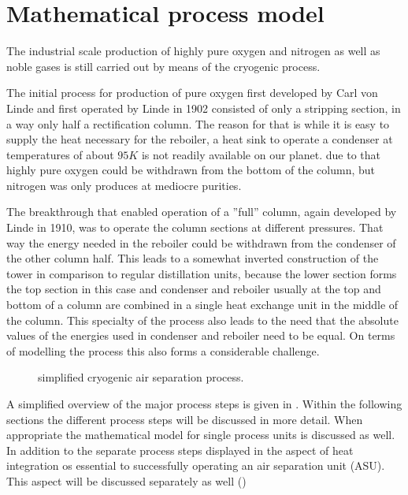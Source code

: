 \chapter{Mathematical process model}
\label{chp:MathModel}

    The industrial scale production of highly pure oxygen and nitrogen as well as noble
    gases is still carried out by means of the cryogenic process.

    The initial process for production of pure oxygen first developed by Carl von Linde
    and first operated by Linde in 1902 \cite{Barron.1985} consisted of only
    a stripping section, in a way only half a rectification column. The reason for that is
    while it is easy to supply the heat necessary for the reboiler, a heat sink to operate
    a condenser at temperatures of about $95 K$ is not readily available on our planet.
    due to that highly pure oxygen could be withdrawn from the bottom of the column, but
    nitrogen was only produces at mediocre purities.

    The breakthrough that enabled operation of a ''full'' column, again developed by Linde in 1910,  was to operate the
    column sections at different pressures. That way the energy needed in the reboiler
    could be withdrawn from the condenser of the other column half. This leads to a
    somewhat inverted construction of the tower in comparison to regular distillation
    units, because the lower section forms the top section in this case and condenser
    and reboiler usually at the top and bottom of a column are combined in a single
    heat exchange unit in the middle of the column. This specialty of the process also
    leads to the need that the absolute values of the energies used in condenser and
    reboiler need to be equal. On terms of modelling the process this also forms a
    considerable challenge.

    \begin{figure}
        
        \caption{simplified cryogenic air separation process.}
        \label{fig:asu_simple}
    \end{figure}

    A simplified overview of the major process steps is given in .
    Within the following sections the different process steps will be discussed in more detail.
    When appropriate the mathematical model for single process units is discussed as well.
    In addition to the separate process steps displayed in  the aspect
    of heat integration os essential to successfully operating an air separation unit (ASU).
    This aspect will be discussed separately as well ()

